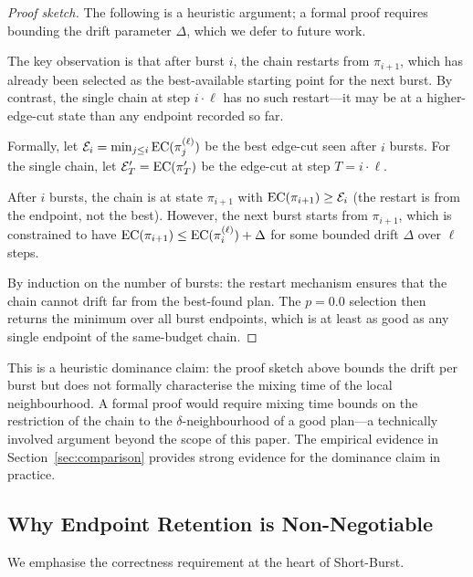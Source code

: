 \begin{proof}[Proof sketch]
The following is a heuristic argument; a formal proof requires bounding
the drift parameter $\Delta$, which we defer to future work.

The key observation is that after burst $i$, the chain restarts from
$\pi_{i+1}$, which has already been selected as the best-available
starting point for the next burst.
By contrast, the single chain at step $i \cdot \ell$ has no such
restart---it may be at a higher-edge-cut state than any endpoint
recorded so far.

Formally, let $\mathcal{E}_i = \min_{j \leq i} \mathrm{EC}(\pi_j^{(\ell)})$
be the best edge-cut seen after $i$ bursts.
For the single chain, let $\mathcal{E}'_T = \mathrm{EC}(\pi'_T)$ be the
edge-cut at step $T = i \cdot \ell$.

After $i$ bursts, the \shb{} chain is at state $\pi_{i+1}$ with
$\mathrm{EC}(\pi_{i+1}) \geq \mathcal{E}_i$ (the restart is from the endpoint,
not the best).
However, the next burst starts from $\pi_{i+1}$, which is constrained
to have $\mathrm{EC}(\pi_{i+1}) \leq \mathrm{EC}(\pi_i^{(\ell)}) + \Delta$ for some
bounded drift $\Delta$ over $\ell$ steps.

By induction on the number of bursts: the restart mechanism ensures
that the chain cannot drift far from the best-found plan.
The $p = 0.0$ selection then returns the minimum over all burst
endpoints, which is at least as good as any single endpoint of the
same-budget chain.
\end{proof}

\begin{remark}
This is a heuristic dominance claim: the proof sketch above bounds the
drift per burst but does not formally characterise the mixing time of
the local neighbourhood.
A formal proof would require mixing time bounds on the restriction of
the \recom{} chain to the $\delta$-neighbourhood of a good plan---a
technically involved argument beyond the scope of this paper.
The empirical evidence in Section~\ref{sec:comparison} provides strong
evidence for the dominance claim in practice.
\end{remark}

\subsection{Why Endpoint Retention is Non-Negotiable}

We emphasise the correctness requirement at the heart of Short-Burst.


